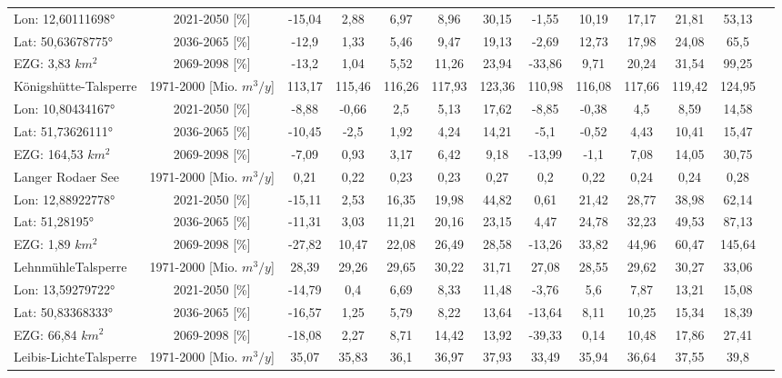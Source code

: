 \begin{longtable}{@{\extracolsep{\fill}}lc|ccccc||cccccc}
\cline{2-13} 
Lon: 12,60111698° & 2021-2050 [\%]  & -15,04 & 2,88 & 6,97 & 8,96 & 30,15 & -1,55 & 10,19 & 17,17 & 21,81 & 53,13 & \\ 
Lat: 50,63678775° & 2036-2065 [\%]  & -12,9 & 1,33 & 5,46 & 9,47 & 19,13 & -2,69 & 12,73 & 17,98 & 24,08 & 65,5 & \\ 
EZG: 3,83 $km^2$ & 2069-2098 [\%]  & -13,2 & 1,04 & 5,52 & 11,26 & 23,94 & -33,86 & 9,71 & 20,24 & 31,54 & 99,25 & \\ 
\hline 
Königshütte-Talsperre & 1971-2000 [Mio. $m^3/y$]  & 113,17 & 115,46 & 116,26 & 117,93 & 123,36 & 110,98 & 116,08 & 117,66 & 119,42 & 124,95 & \\ 
\cline{2-13} 
Lon: 10,80434167° & 2021-2050 [\%]  & -8,88 & -0,66 & 2,5 & 5,13 & 17,62 & -8,85 & -0,38 & 4,5 & 8,59 & 14,58 & \\ 
Lat: 51,73626111° & 2036-2065 [\%]  & -10,45 & -2,5 & 1,92 & 4,24 & 14,21 & -5,1 & -0,52 & 4,43 & 10,41 & 15,47 & \\ 
EZG: 164,53 $km^2$ & 2069-2098 [\%]  & -7,09 & 0,93 & 3,17 & 6,42 & 9,18 & -13,99 & -1,1 & 7,08 & 14,05 & 30,75 & \\ 
\hline 
Langer Rodaer See & 1971-2000 [Mio. $m^3/y$]  & 0,21 & 0,22 & 0,23 & 0,23 & 0,27 & 0,2 & 0,22 & 0,24 & 0,24 & 0,28 & \\ 
\cline{2-13} 
Lon: 12,88922778° & 2021-2050 [\%]  & -15,11 & 2,53 & 16,35 & 19,98 & 44,82 & 0,61 & 21,42 & 28,77 & 38,98 & 62,14 & \\ 
Lat: 51,28195° & 2036-2065 [\%]  & -11,31 & 3,03 & 11,21 & 20,16 & 23,15 & 4,47 & 24,78 & 32,23 & 49,53 & 87,13 & \\ 
EZG: 1,89 $km^2$ & 2069-2098 [\%]  & -27,82 & 10,47 & 22,08 & 26,49 & 28,58 & -13,26 & 33,82 & 44,96 & 60,47 & 145,64 & \\ 
\hline 
LehnmühleTalsperre & 1971-2000 [Mio. $m^3/y$]  & 28,39 & 29,26 & 29,65 & 30,22 & 31,71 & 27,08 & 28,55 & 29,62 & 30,27 & 33,06 & \\ 
\cline{2-13} 
Lon: 13,59279722° & 2021-2050 [\%]  & -14,79 & 0,4 & 6,69 & 8,33 & 11,48 & -3,76 & 5,6 & 7,87 & 13,21 & 15,08 & \\ 
Lat: 50,83368333° & 2036-2065 [\%]  & -16,57 & 1,25 & 5,79 & 8,22 & 13,64 & -13,64 & 8,11 & 10,25 & 15,34 & 18,39 & \\ 
EZG: 66,84 $km^2$ & 2069-2098 [\%]  & -18,08 & 2,27 & 8,71 & 14,42 & 13,92 & -39,33 & 0,14 & 10,48 & 17,86 & 27,41 & \\ 
\hline 
Leibis-LichteTalsperre & 1971-2000 [Mio. $m^3/y$]  & 35,07 & 35,83 & 36,1 & 36,97 & 37,93 & 33,49 & 35,94 & 36,64 & 37,55 & 39,8 & \\ 

\end{longtable}
